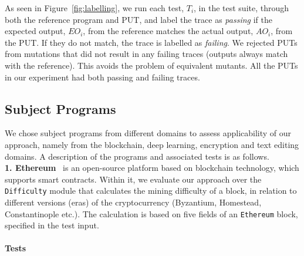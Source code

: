 As seen in Figure~\ref{fig:labelling}, we run each test, $T_i$, in the test suite, through both the reference program and PUT, and label the trace as \emph{passing} if the expected output, $EO_i$, from the reference matches the actual output, $AO_i$, from the PUT. If they do not match, the trace is labelled as \emph{failing}.  
We rejected PUTs from mutations that did not result in any failing traces (outputs always match with the reference). This avoids the problem of equivalent mutants. 
All the PUTs in our experiment had both passing and failing traces. 

\subsection{Subject Programs}
\label{sec:subj-programs}
We chose subject programs from different domains to assess applicability of our approach, namely from the blockchain, deep learning, encryption and text editing domains. A description of the programs and associated tests is as follows. \\
\noindent\textbf{1. Ethereum}~\cite{ethereum} is an open-source platform based on blockchain technology, which supports smart contracts. Within it, we evaluate our approach over the \texttt{Difficulty} module that calculates the mining difficulty of a block, in relation to different versions (eras) of the cryptocurrency (Byzantium, Homestead, Constantinople etc.). The calculation is based on five fields of an \texttt{Ethereum} block, specified in the test input. 

\paragraph{Tests}

